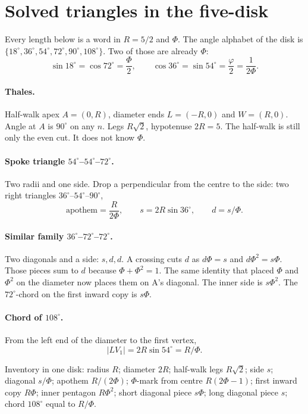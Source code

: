 \documentclass[10pt,a4paper]{article}
\theoremstyle{plain}
\theoremstyle{definition}
\begin{document}
\section{Solved triangles in the five-disk}

Every length below is a word in $R=5/2$ and $\Phi$.
The angle alphabet of the disk is $\{18^{\circ},36^{\circ},54^{\circ},72^{\circ},90^{\circ},108^{\circ}\}$.
Two of those are already $\Phi$:
\[
\sin18^{\circ}=\cos72^{\circ}=\frac\Phi2,\qquad
\cos36^{\circ}=\sin54^{\circ}=\frac\varphi2=\frac1{2\Phi}.
\]

\paragraph{Thales.}
Half-walk apex $A=(0,R)$, diameter ends $L=(-R,0)$ and $W=(R,0)$.
Angle at $A$ is $90^{\circ}$ on any $n$.
Legs $R\sqrt2$, hypotenuse $2R=5$.
The half-walk is still only the even cut.
It does not know $\Phi$.

\paragraph{Spoke triangle $54^{\circ}$--$54^{\circ}$--$72^{\circ}$.}
Two radii and one side.
Drop a perpendicular from the centre to the side: two right triangles $36^{\circ}$--$54^{\circ}$--$90^{\circ}$,
\[
\text{apothem}=\frac R{2\Phi},\qquad
s=2R\sin36^{\circ},\qquad
d=s/\Phi.
\]

\paragraph{Similar family $36^{\circ}$--$72^{\circ}$--$72^{\circ}$.}
Two diagonals and a side: $s,d,d$.
A crossing cuts $d$ as $d\Phi=s$ and $d\Phi^{2}=s\Phi$.
Those pieces sum to $d$ because $\Phi+\Phi^{2}=1$.
The same identity that placed $\Phi$ and $\Phi^{2}$ on the diameter now places them on A's diagonal.
The inner side is $s\Phi^{2}$.
The $72^{\circ}$-chord on the first inward copy is $s\Phi$.

\paragraph{Chord of $108^{\circ}$.}
From the left end of the diameter to the first vertex,
\[
|LV_1|=2R\sin54^{\circ}=R/\Phi.
\]

Inventory in one disk: radius $R$; diameter $2R$; half-walk legs $R\sqrt2$; side $s$; diagonal $s/\Phi$; apothem $R/(2\Phi)$; $\Phi$-mark from centre $R(2\Phi-1)$; first inward copy $R\Phi$; inner pentagon $R\Phi^{2}$; short diagonal piece $s\Phi$; long diagonal piece $s$; chord $108^{\circ}$ equal to $R/\Phi$.
\end{document}
